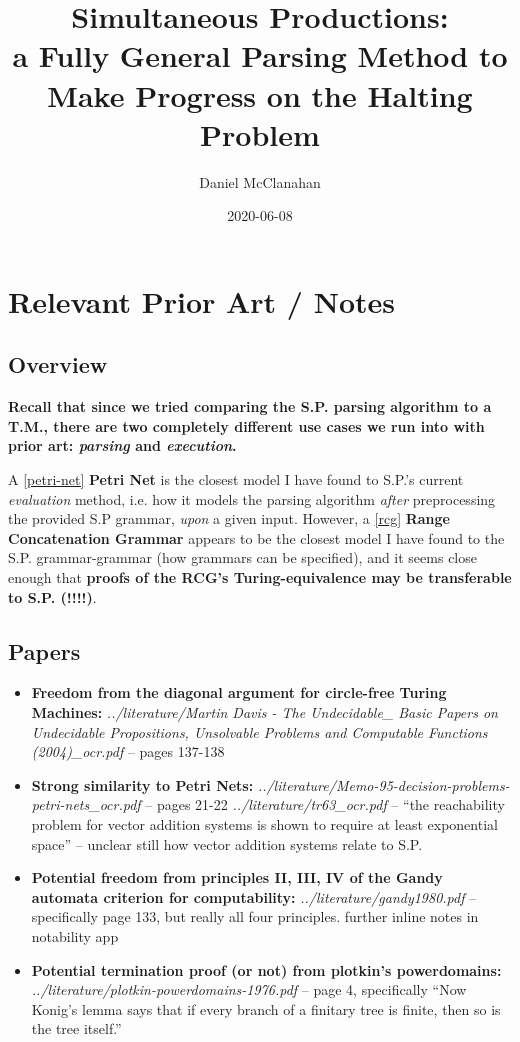\documentclass{article}
\title{Simultaneous Productions: \\ a Fully General Parsing Method to Make Progress on the Halting Problem}
\date{2020-06-08}
\author{Daniel McClanahan}
\begin{document}
\maketitle

\section{Relevant Prior Art / Notes}
\subsection{Overview}

\textbf{Recall that since we tried comparing the S.P. parsing algorithm to a T.M., there are two completely different use cases we run into with prior art: \textit{parsing} and \textit{execution}.}

A \ref{petri-net} \textbf{Petri Net} is the closest model I have found to S.P.'s current \textit{evaluation} method, i.e. how it models the parsing algorithm \textit{after} preprocessing the provided S.P grammar, \textit{upon} a given input. However, a \ref{rcg} \textbf{Range Concatenation Grammar} appears to be the closest model I have found to the S.P. grammar-grammar (how grammars can be specified), and it seems close enough that \textbf{proofs of the RCG's Turing-equivalence may be transferable to S.P. (!!!!)}.

\subsection{Papers}
\begin{itemize}
  \item \textbf{Freedom from the diagonal argument for circle-free Turing Machines:} \textit{../literature/Martin Davis - The Undecidable\_ Basic Papers on Undecidable Propositions, Unsolvable Problems and Computable Functions (2004)\_ocr.pdf} -- pages 137-138
  \item {} \label{petri-net} \textbf{Strong similarity to Petri Nets:} \textit{../literature/Memo-95-decision-problems-petri-nets\_ocr.pdf} -- pages 21-22
    \textit{../literature/tr63\_ocr.pdf} -- ``the reachability problem for vector addition systems is shown to require at least exponential space'' -- unclear still how vector addition systems relate to S.P.
  \item \textbf{Potential freedom from principles II, III, IV of the Gandy automata criterion for computability:} \textit{../literature/gandy1980.pdf} -- specifically page 133, but really all four principles. further inline notes in notability app
  \item \textbf{Potential termination proof (or not) from plotkin's powerdomains:} \textit{../literature/plotkin-powerdomains-1976.pdf} -- page 4, specifically ``Now Konig’s
lemma says that if every branch of a finitary tree is finite, then so is the tree
itself.''
\end{itemize}
\end{document}
